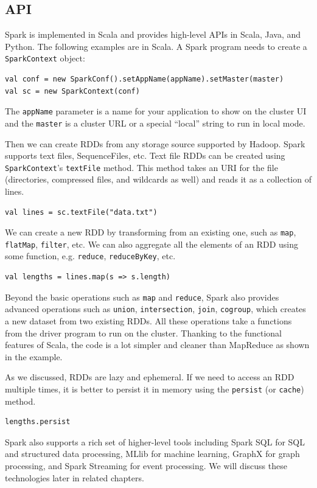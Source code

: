 \documentclass[11pt]{book}
\begin{document}
\subsection{API}
Spark is implemented in Scala and provides high-level APIs in Scala, Java, and Python. The following examples are in Scala. A Spark program needs to create a \texttt{SparkContext} object:
\begin{lstlisting}
val conf = new SparkConf().setAppName(appName).setMaster(master)
val sc = new SparkContext(conf)
\end{lstlisting}
The \texttt{appName} parameter is a name for your application to show on the cluster UI and the \texttt{master} is a cluster URL or a special ``local'' string to run in local mode.

Then we can create RDDs from any storage source supported by Hadoop. Spark supports text files, SequenceFiles, etc.
Text file RDDs can be created using \texttt{SparkContext}'s \texttt{textFile} method. This method takes an URI for the file (directories, compressed files, and wildcards as well) and reads it as a collection of lines.
\begin{lstlisting}
val lines = sc.textFile("data.txt")
\end{lstlisting}

We can create a new RDD by transforming from an existing one, such as \texttt{map}, \texttt{flatMap}, \texttt{filter}, etc. We can also aggregate all the elements of an RDD using some function, e.g. \texttt{reduce}, \texttt{reduceByKey}, etc.
\begin{lstlisting}
val lengths = lines.map(s => s.length)
\end{lstlisting}
Beyond the basic operations such as \texttt{map} and \texttt{reduce}, Spark also provides advanced operations such as \texttt{union}, \texttt{intersection}, \texttt{join}, \texttt{cogroup}, which creates a new dataset from two existing RDDs.
All these operations take a functions from the driver program to run on the cluster. Thanking to the functional features of Scala, the code is a lot simpler and cleaner than MapReduce as shown in the example.

As we discussed, RDDs are lazy and ephemeral. If we need to access an RDD multiple times, it is better to persist it in memory using the \texttt{persist} (or \texttt{cache}) method.
\begin{lstlisting}
lengths.persist
\end{lstlisting}

Spark also supports a rich set of higher-level tools including Spark SQL for SQL and structured data processing, MLlib for machine learning, GraphX for graph processing, and Spark Streaming for event processing. We will discuss these technologies later in related chapters. 
\end{document}
